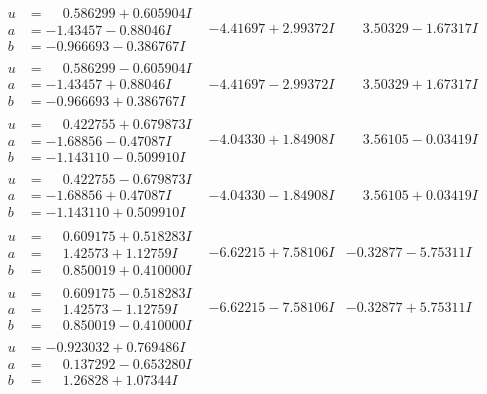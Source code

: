 \documentclass[1p]{elsarticle_modified}
\theoremstyle{definition}
\begin{document}
$$\begin{array}{c|c|c}
\begin{aligned}
u &= \phantom{-}0.586299 + 0.605904 I \\
a &= -1.43457 - 0.88046 I \\
b &= -0.966693 - 0.386767 I\end{aligned}
 & -4.41697 + 2.99372 I & \phantom{-}3.50329 - 1.67317 I \\ \hline\begin{aligned}
u &= \phantom{-}0.586299 - 0.605904 I \\
a &= -1.43457 + 0.88046 I \\
b &= -0.966693 + 0.386767 I\end{aligned}
 & -4.41697 - 2.99372 I & \phantom{-}3.50329 + 1.67317 I \\ \hline\begin{aligned}
u &= \phantom{-}0.422755 + 0.679873 I \\
a &= -1.68856 - 0.47087 I \\
b &= -1.143110 - 0.509910 I\end{aligned}
 & -4.04330 + 1.84908 I & \phantom{-}3.56105 - 0.03419 I \\ \hline\begin{aligned}
u &= \phantom{-}0.422755 - 0.679873 I \\
a &= -1.68856 + 0.47087 I \\
b &= -1.143110 + 0.509910 I\end{aligned}
 & -4.04330 - 1.84908 I & \phantom{-}3.56105 + 0.03419 I \\ \hline\begin{aligned}
u &= \phantom{-}0.609175 + 0.518283 I \\
a &= \phantom{-}1.42573 + 1.12759 I \\
b &= \phantom{-}0.850019 + 0.410000 I\end{aligned}
 & -6.62215 + 7.58106 I & -0.32877 - 5.75311 I \\ \hline\begin{aligned}
u &= \phantom{-}0.609175 - 0.518283 I \\
a &= \phantom{-}1.42573 - 1.12759 I \\
b &= \phantom{-}0.850019 - 0.410000 I\end{aligned}
 & -6.62215 - 7.58106 I & -0.32877 + 5.75311 I \\ \hline\begin{aligned}
u &= -0.923032 + 0.769486 I \\
a &= \phantom{-}0.137292 - 0.653280 I \\
b &= \phantom{-}1.26828 + 1.07344 I\end{aligned}

\end{array}$$
\end{document}
